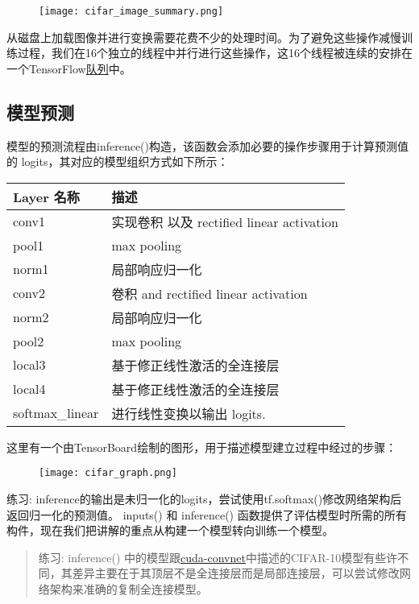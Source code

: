 \begin{figure}[H]
	\centering
	\texttt{[image: cifar\_image\_summary.png]}
\end{figure}
从磁盘上加载图像并进行变换需要花费不少的处理时间。为了避免这些操作减慢训练过程，我们在16个独立的线程中并行进行这些操作，这16个线程被连续的安排在一个TensorFlow\href{https://www.tensorflow.org/api_docs/python/tf/train/shuffle_batch}{队列}中。
\subsection{模型预测}
模型的预测流程由inference()构造，该函数会添加必要的操作步骤用于计算预测值的 logits，其对应的模型组织方式如下所示：

\begin{table}[!h]
	\centering
	\begin{tabular}{|p{2cm}|p{8cm}|}
	\hline
	Layer 名称&描述\\
	\hline
	conv1&实现卷积 以及 rectified linear activation\\
	\hline
	pool1&max pooling\\
	\hline
	norm1&局部响应归一化\\
	\hline
	conv2&卷积 and rectified linear activation\\
	\hline
	norm2&局部响应归一化\\
	\hline
	pool2&max pooling\\
	\hline
	local3&基于修正线性激活的全连接层\\
	\hline
	local4&基于修正线性激活的全连接层\\
	\hline
	softmax\_linear&进行线性变换以输出 logits.\\
	\hline
	\end{tabular}
\end{table}
这里有一个由TensorBoard绘制的图形，用于描述模型建立过程中经过的步骤：

\begin{figure}[H]
\centering
\texttt{[image: cifar\_graph.png]}
\end{figure}

练习: inference的输出是未归一化的logits，尝试使用tf.softmax()修改网络架构后返回归一化的预测值。
inputs() 和 inference() 函数提供了评估模型时所需的所有构件，现在我们把讲解的重点从构建一个模型转向训练一个模型。

\begin{quote}
练习: inference() 中的模型跟\href{https://code.google.com/p/cuda-convnet/}{cuda-convnet}中描述的CIFAR-10模型有些许不同，其差异主要在于其顶层不是全连接层而是局部连接层，可以尝试修改网络架构来准确的复制全连接模型。
\end{quote}

